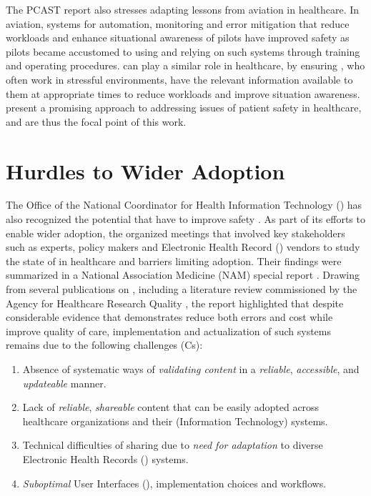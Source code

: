The PCAST report also stresses adapting lessons from aviation in healthcare.
In aviation, systems for automation, monitoring and error mitigation that
reduce workloads and enhance situational awareness of pilots have
improved safety as pilots became accustomed to using and relying on such
systems through training and operating procedures. \CDSSs{} can play a similar
role in healthcare, by ensuring \HCPs{}, who often work in stressful
environments, have the relevant information available to them at appropriate
times to reduce workloads and improve situation awareness. \CDSSs{}
present a promising approach to addressing issues of patient safety in
healthcare, and are thus the focal point of this work.

\section{Hurdles to Wider \CDSS{} Adoption}\label{sec:hurdles-cdss-adoption}

The Office of the National Coordinator for Health Information Technology
(\ONC{}) \cite{ONCUrl} has also recognized the potential that \CDSS{} have to
improve safety \cite{ONCCDSUrl}. As part of its efforts to enable wider
\CDSS{} adoption, the \ONC{} organized meetings that involved key stakeholders
such as \CDSS{} experts, policy makers and Electronic Health
Record (\EHR{}) vendors to study the state of \CDSS{} in healthcare and barriers
limiting adoption. Their findings were summarized in a National Association Medicine (NAM) special
report \cite{Nam17}. Drawing from several publications on \CDSSs{}, including a
literature review commissioned by the Agency for Healthcare Research Quality \cite{BrightAIM12},
the report highlighted that despite considerable evidence that demonstrates
\CDSSs{} reduce both errors and cost while improve quality of care,
implementation and actualization of such systems remains  due to
the following challenges (Cs):

\begin{enumerate}[label=C\arabic*.]
\itemsep0.0em
\item Absence of systematic ways of \emph{validating content}
in a \emph{reliable}, \emph{accessible}, and \emph{updateable} manner.
\item Lack of \emph{reliable}, \emph{shareable} \CDSS{} content
that can be easily adopted across healthcare organizations and their (Information
Technology) \IT{} systems.
\item Technical difficulties of sharing due to \emph{need for
  adaptation} to diverse Electronic Health Records (\EHR) systems.
\item \emph{Suboptimal} User Interfaces (\UIs), implementation choices and
workflows.
\end{enumerate}

